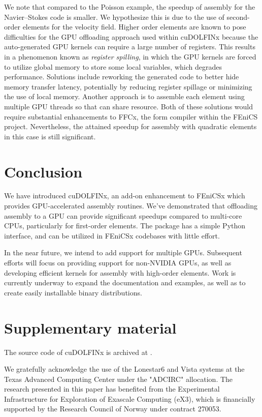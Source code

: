 We note that compared to the Poisson example, the speedup of assembly for the Navier--Stokes code is smaller. We hypothesize this is due to the use of second-order elements for the velocity field. Higher order elements are known to pose difficulties for the GPU offloading approach used within cuDOLFINx because the auto-generated GPU kernels can require a large number of registers. This results in a phenomenon known as \textit{register spilling}, in which the GPU kernels are forced to utilize global memory to store some local variables, which degrades performance. Solutions include reworking the generated code to better hide memory transfer latency, potentially by reducing register spillage or minimizing the use of local memory. Another approach is to assemble each element using multiple GPU threads so that can share resource. Both of these solutions would require substantial enhancements to FFCx, the form compiler within the FEniCS project. Nevertheless, the attained speedup for assembly with quadratic elements in this case is still significant.

\section*{Conclusion}
We have introduced cuDOLFINx, an add-on enhancement to FEniCSx which provides GPU-accelerated assembly routines. We've demonstrated that offloading assembly to a GPU can provide significant speedups compared to multi-core CPUs, particularly for first-order elements. The package has a simple Python interface, and can be utilized in FEniCSx codebases with little effort.

In the near future, we intend to add support for multiple GPUs. Subsequent efforts will focus on providing support for non-NVIDIA GPUs, as well as developing efficient kernels for assembly with high-order elements. Work is currently underway to expand the documentation and examples, as well as to create easily installable binary distributions.

\section*{Supplementary material}
The source code of cuDOLFINx is archived at \citep{cudolfinxzenodo}.

\begin{acknowledgement}
  We gratefully acknowledge the use of the Lonestar6 and Vista systems at the Texas Advanced Computing Center under the "ADCIRC" allocation.
  The research presented in this paper has benefited from the Experimental Infrastructure for Exploration of Exascale Computing (eX3), which is financially supported by the Research Council of Norway under contract 270053.
\end{acknowledgement}



